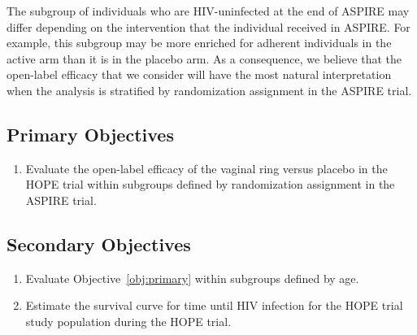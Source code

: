 \documentclass[12pt]{article}
\theoremstyle{definition}
\begin{document}
The subgroup of individuals who are HIV-uninfected at the end of ASPIRE may differ depending on the intervention that the individual received in ASPIRE. For example, this subgroup may be more enriched for adherent individuals in the active arm than it is in the placebo arm. As a consequence, we believe that the open-label efficacy that we consider will have the most natural interpretation when the analysis is stratified by randomization assignment in the ASPIRE trial.


\subsection{Primary Objectives}
\begin{enumerate}
    \item\label{obj:primary} Evaluate the open-label efficacy of the vaginal ring versus placebo in the HOPE trial within subgroups defined by randomization assignment in the ASPIRE trial.%
\end{enumerate}

\subsection{Secondary Objectives}
\begin{enumerate}[resume*]
	\item Evaluate Objective~\ref{obj:primary} within subgroups defined by age.
	\item Estimate the survival curve for time until HIV infection for the HOPE trial study population during the HOPE trial.
\end{enumerate}

\end{document}

